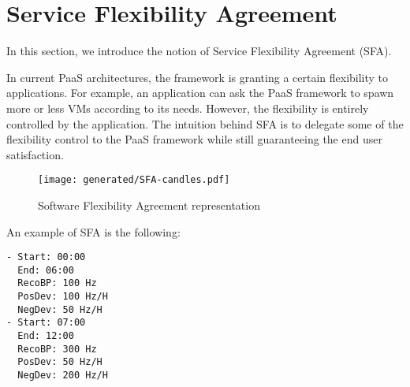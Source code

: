 \section{Service Flexibility Agreement}
In this section, we introduce the notion of Service Flexibility Agreement (SFA). 

In current PaaS architectures, the framework is granting a certain flexibility to applications.
For example, an application can ask the PaaS framework to spawn more or less VMs according to its needs.
However, the flexibility is entirely controlled by the application.
The intuition behind SFA is to delegate some of the flexibility control to the PaaS framework while still guaranteeing the end user satisfaction.






 

\begin{figure}[h]
\centering
\texttt{[image: generated/SFA-candles.pdf]}
\caption{Software Flexibility Agreement representation}
\label{fig:EASC}
\end{figure}

An example of SFA is the following:
\begin{lstlisting}[caption={SFA example}, label={lst:SFA}]
- Start: 00:00
  End: 06:00
  RecoBP: 100 Hz
  PosDev: 100 Hz/H
  NegDev: 50 Hz/H
- Start: 07:00
  End: 12:00
  RecoBP: 300 Hz
  PosDev: 50 Hz/H
  NegDev: 200 Hz/H
\end{lstlisting}

